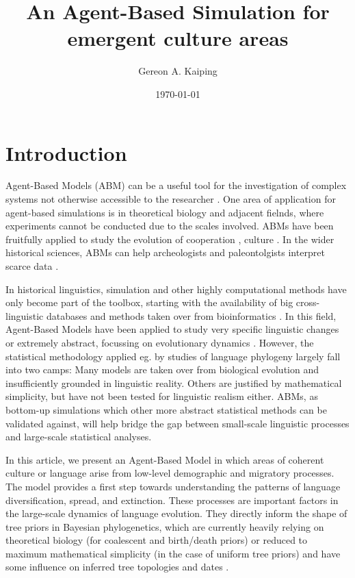 \documentclass[a4paper,12pt]{scrartcl}
\title{An Agent-Based Simulation for emergent culture areas}
\date{\today}
\author[1]{Gereon A. Kaiping}
\affil[1]{Geographic Information Science Center, Universität Zürich, CH}
\begin{document}
\maketitle
\section{Introduction}
Agent-Based Models (ABM) \parencite{} can be a useful tool for the investigation
of complex systems not otherwise accessible to the researcher \parencite{}. One
area of application for agent-based simulations is in theoretical biology and
adjacent fielnds, where experiments cannot be conducted due to the scales
involved. ABMs have been fruitfully applied to study the evolution of
cooperation \parencite{}, culture \parencite{}. In the wider historical
sciences, ABMs can help archeologists and paleontolgists interpret scarce data
\parencite{cegielski2016rethinking,barcelo2016simulating}.

In historical linguistics, simulation and other highly computational methods
have only become part of the toolbox, starting with the availability of big
cross-linguistic databases and methods taken over from bioinformatics
\parencite{}. In this field, Agent-Based Models have been applied to study very
specific linguistic changes
\cite{bloem2015agentbased,feltgen2017modeling,grim2011simulating,radulescu2016modelling,vantrijp2016evolution}
or extremely abstract, focussing on evolutionary dynamics
\cite{arita1998evolution,castello2013agentbased,javarone2014competitive}.
However, the statistical methodology applied eg. by studies of language
phylogeny largely fall into two camps: Many models are taken over from
biological evolution and insufficiently grounded in linguistic reality. Others
are justified by mathematical simplicity, but have not been tested for
linguistic realism either. ABMs, as bottom-up simulations which other more
abstract statistical methods can be validated against, will help bridge the gap
between small-scale linguistic processes and large-scale statistical analyses.

In this article, we present an Agent-Based Model in which areas of coherent
culture or language arise from low-level demographic and migratory processes.
The model provides a first step towards understanding the patterns of language
diversification, spread, and extinction. These processes are important factors
in the large-scale dynamics of language evolution. They directly inform the
shape of tree priors in Bayesian phylogenetics, which are currently heavily
relying on theoretical biology (for coalescent and birth/death priors) or
reduced to maximum mathematical simplicity (in the case of uniform tree priors)
and have some influence on inferred tree topologies and dates
\cite{rama2018three}.
\end{document}
